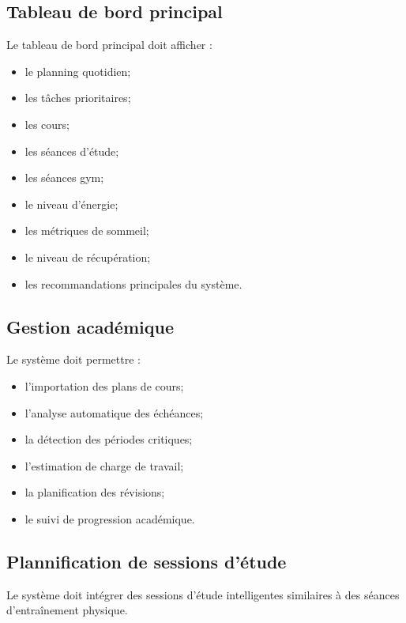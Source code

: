 \documentclass[12pt]{article}
\begin{document}
\subsection{Tableau de bord principal}

Le tableau de bord principal doit afficher :
\begin{itemize}
    \item le planning quotidien;
    \item les tâches prioritaires;
    \item les cours;
    \item les séances d’étude;
    \item les séances gym;
    \item le niveau d’énergie;
    \item les métriques de sommeil;
    \item le niveau de récupération;
    \item les recommandations principales du système.
\end{itemize}

\subsection{Gestion académique}

Le système doit permettre :
\begin{itemize}
    \item l’importation des plans de cours;
    \item l’analyse automatique des échéances;
    \item la détection des périodes critiques;
    \item l’estimation de charge de travail;
    \item la planification des révisions;
    \item le suivi de progression académique.
\end{itemize}

\subsection{Plannification de sessions d'étude}

Le système doit intégrer des sessions d’étude intelligentes similaires à des séances d’entraînement physique.
\end{document}
